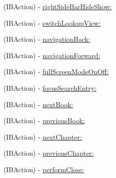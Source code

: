 \begin{DoxyCompactItemize}
(I\-B\-Action) -\/ \hyperlink{interface_window_host_controller_a7a94333e829cba8ea9389f054862d5e8}{right\-Side\-Bar\-Hide\-Show\-:}
\item 
(I\-B\-Action) -\/ \hyperlink{interface_window_host_controller_a694f58c6afa324646611b3c1b336b6de}{switch\-Lookup\-View\-:}
\item 
(I\-B\-Action) -\/ \hyperlink{interface_window_host_controller_a4ec972591bfbe986c29481752489bb7f}{navigation\-Back\-:}
\item 
(I\-B\-Action) -\/ \hyperlink{interface_window_host_controller_a6ad4335b3d6a5e7b82a150b1d6af813c}{navigation\-Forward\-:}
\item 
(I\-B\-Action) -\/ \hyperlink{interface_window_host_controller_a039f89a557a3955a07c700c8a7a1f781}{full\-Screen\-Mode\-On\-Off\-:}
\item 
(I\-B\-Action) -\/ \hyperlink{interface_window_host_controller_ac20a8823c41a8eb84d69a87b9493ab64}{focus\-Search\-Entry\-:}
\item 
(I\-B\-Action) -\/ \hyperlink{interface_window_host_controller_a7b7685c643a48ad37f25d585f1866649}{next\-Book\-:}
\item 
(I\-B\-Action) -\/ \hyperlink{interface_window_host_controller_a581d7b2440e58185f5e41c7cd6af155d}{previous\-Book\-:}
\item 
(I\-B\-Action) -\/ \hyperlink{interface_window_host_controller_a87ff06783b2bc09031f5ccd2a72c3938}{next\-Chapter\-:}
\item 
(I\-B\-Action) -\/ \hyperlink{interface_window_host_controller_ae5eb6b46b077d6f29f42f385df24e0b9}{previous\-Chapter\-:}
\item 
(I\-B\-Action) -\/ \hyperlink{interface_window_host_controller_a7808d4ab43585768c54db08e0b78bae9}{perform\-Close\-:}
\end{DoxyCompactItemize}
